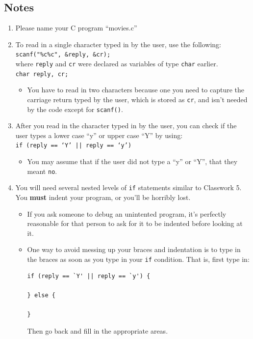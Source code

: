 \documentclass[letter,11pt]{article}
\begin{document}
\subsection*{Notes}
\begin{enumerate}
    \item Please name your C program ``movies.c''
    \item To read in a single character typed in by the user, use the following: \\
    \texttt{scanf("\%c\%c", \&reply, \&cr);} \\
    where \texttt{reply} and \texttt{cr} were declared as variables of type \texttt{char} earlier. \\
    \texttt{char reply, cr;}
    \begin{itemize}
        \item You have to read in two characters because one you need to capture the carriage return typed by the user, which is stored as \texttt{cr}, and isn't needed by the code except for \texttt{scanf()}.
    \end{itemize}
    \item After you read in the character typed in by the user, you can check if the user types a lower case ``y'' or upper case ``Y'' by using: \\
    \texttt{if (reply == `Y' || reply == `y')}
    \begin{itemize}
        \item You may assume that if the user did not type a ``y'' or ``Y'', that they meant \texttt{no}.
    \end{itemize}
    \item You will need several nested levels of \texttt{if} statements similar to Classwork 5. You \textbf{must} indent your program, or you'll be horribly lost.
    \begin{itemize}
        \item If you ask someone to debug an unintented program, it's perfectly reasonable for that person to ask for it to be indented before looking at it.
        \item One way to avoid messing up your braces and indentation is to type in the braces as soon as you type in your \texttt{if} condition. That is, first type in:
        \begin{verbatim}
if (reply == `Y' || reply == `y') {

} else {

}
        \end{verbatim}Then go back and fill in the appropriate areas.
    \end{itemize}
\end{enumerate}
\end{document}

